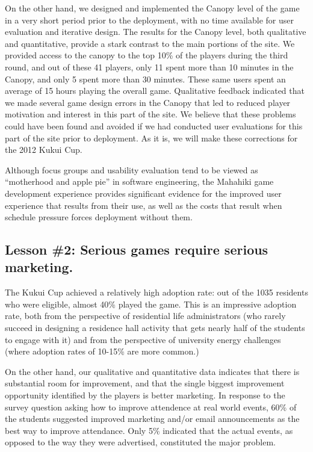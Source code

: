 \documentclass{acm_proc_article-sp}
\begin{document}
On the other hand, we designed and implemented the Can\-opy level of the
game in a very short period prior to the deployment, with no time available
for user evaluation and iterative design.  The results for the Canopy
level, both qualitative and quantitative, provide a stark contrast to the
main portions of the site.  We provided access to the canopy to the top
10\% of the players during the third round, and out of these 41 players,
only 11 spent more than 10 minutes in the Canopy, and only 5 spent more
than 30 minutes. These same users spent an average of 15 hours playing the
overall game.  Qualitative feedback indicated that we made several game
design errors in the Canopy that led to reduced player motivation and
interest in this part of the site.  We believe that these problems could
have been found and avoided if we had conducted user evaluations for this
part of the site prior to deployment.  As it is, we will make these
corrections for the 2012 Kukui Cup.

Although focus groups and usability evaluation tend to be viewed as
``motherhood and apple pie'' in software engineering, the Mahahiki game
development experience provides significant evidence for the improved user
experience that results from their use, as well as the costs that result
when schedule pressure forces deployment without them.

\subsection{Lesson \#2: Serious games require serious marketing.}

The Kukui Cup achieved a relatively high adoption rate: out of the 1035
residents who were eligible, almost 40\% played the game.  This is an
impressive adoption rate, both from the perspective of residential life
administrators (who rarely succeed in designing a residence hall activity
that gets nearly half of the students to engage with it) and from the
perspective of university energy challenges (where adoption rates of
10-15\% are more common.)  

On the other hand, our qualitative and quantitative data indicates that
there is substantial room for improvement, and that the single biggest
improvement opportunity identified by the players is better marketing.  In
response to the survey question asking how to improve attendence at real
world events, 60\% of the students suggested improved marketing and/or email
announcements as the best way to improve attendance.  Only 5\% indicated
that the actual events, as opposed to the way they were advertised,
constituted the major problem.
\end{document}
